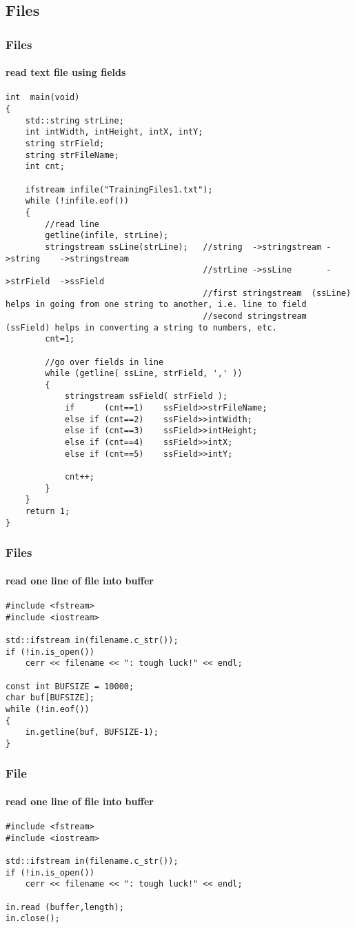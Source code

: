 \subsection{Files}
\begin{frame}[fragile]
\frametitle{Files}
\framesubtitle{read text file using fields}
\logoCSIPCPL\mypagenum
\tiny
\begin{verbatim}
int  main(void)
{
	std::string strLine;
	int intWidth, intHeight, intX, intY;
	string strField;
	string strFileName;
	int cnt;

	ifstream infile("TrainingFiles1.txt");
	while (!infile.eof())
	{
		//read line
		getline(infile, strLine);
		stringstream ssLine(strLine);	//string  ->stringstream ->string	 ->stringstream
										//strLine ->ssLine       ->strField  ->ssField
										//first stringstream  (ssLine)  helps in going from one string to another, i.e. line to field     
										//second stringstream (ssField) helps in converting a string to numbers, etc.
		cnt=1;

		//go over fields in line
		while (getline( ssLine, strField, ',' ))
		{
			stringstream ssField( strField );
			if		(cnt==1)	ssField>>strFileName;	
			else if (cnt==2)	ssField>>intWidth;
			else if (cnt==3)	ssField>>intHeight;
			else if (cnt==4)	ssField>>intX;
			else if (cnt==5)	ssField>>intY;
			
			cnt++;
		}
	}
	return 1;
}
\end{verbatim}
\end{frame}


\begin{frame}[fragile]
\frametitle{Files}
\framesubtitle{read one line of file into buffer}
\logoCSIPCPL\mypagenum
\tiny
\begin{verbatim}
#include <fstream>
#include <iostream>

std::ifstream in(filename.c_str());
if (!in.is_open())
	cerr << filename << ": tough luck!" << endl;

const int BUFSIZE = 10000;
char buf[BUFSIZE];
while (!in.eof())
{
    in.getline(buf, BUFSIZE-1);
}
\end{verbatim}
\end{frame}


\begin{frame}[fragile]
\frametitle{File}
\framesubtitle{read one line of file into buffer}
\logoCSIPCPL\mypagenum
\tiny
\begin{verbatim}
#include <fstream>
#include <iostream>

std::ifstream in(filename.c_str());
if (!in.is_open())
	cerr << filename << ": tough luck!" << endl;

in.read (buffer,length);
in.close();
\end{verbatim}
\end{frame}


